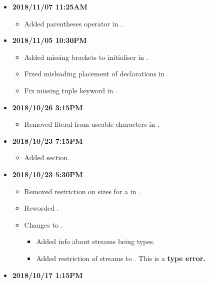\documentclass[../gazprea.tex]{subfiles}
\begin{document}
\begin{itemize}
  \item
    \textbf{2018/11/07 11:25AM}
    \begin{itemize}
      \item Added parentheses operator in  .
    \end{itemize}
  \item
    \textbf{2018/11/05 10:30PM}
    \begin{itemize}
      \item Added missing brackets to  initialiser in .
      \item Fixed misleading placement of declarations in .
      \item Fix missing tuple keyword in .
    \end{itemize}
  \item
    \textbf{2018/10/26 3:15PM}
    \begin{itemize}
      \item Removed literal \code{\\n} from useable characters in .
    \end{itemize}
  \item
    \textbf{2018/10/23 7:15PM}
    \begin{itemize}
      \item Added  section.
    \end{itemize}
  \item
    \textbf{2018/10/23 5:30PM}
    \begin{itemize}
      \item Removed restriction on sizes for a  in .
      \item Reworded .
      \item Changes to .
      \begin{itemize}
        \item Added info about streams being types.
        \item Added restriction of streams to .
          This is a \textbf{type error.}
      \end{itemize}
    \end{itemize}
  \item
    \textbf{2018/10/17 1:15PM}
    \begin{itemize}

\end{itemize}
\end{itemize}
\end{document}
